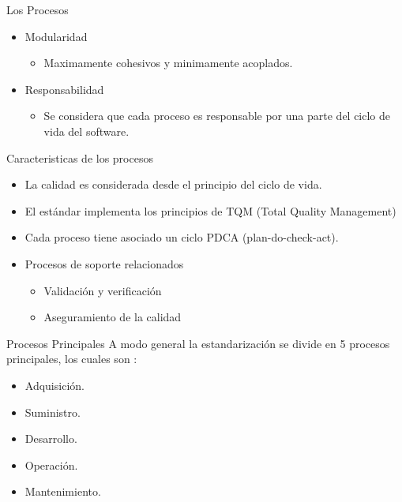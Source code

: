 \documentclass{beamer}
\begin{document}
			\begin{frame}{Los Procesos}
				\begin{itemize}
				 	\item Modularidad\\\pause
				 	\begin{itemize}
				 		\item Maximamente cohesivos y minimamente acoplados.
				 	\end{itemize}	  
				 	\item Responsabilidad\\\pause
				 	\begin{itemize}
				 		\item Se considera que cada proceso es responsable por una parte del ciclo de vida del software.\\
				 	\end{itemize}
				 \end{itemize}
			\end{frame}
			
			\begin{frame}{Caracteristicas de los procesos}
				\begin{itemize}
					\item La calidad es considerada desde el principio del ciclo de vida.\pause
					\item El estándar implementa los principios de TQM (Total Quality Management)\pause
					\item Cada proceso tiene asociado un ciclo PDCA (plan-do-check-act).\pause
					\item Procesos de soporte relacionados\pause
					\begin{itemize}
						\item Validación y verificación 
						\item Aseguramiento de la calidad
					\end{itemize}
				\end{itemize}
			\end{frame}
			
			\begin{frame}{Procesos Principales}
				A modo general la estandarización se divide en 5 procesos principales, los cuales son :\pause  
				\begin{itemize}
					\item Adquisición.
					\item Suministro.
					\item Desarrollo.
					\item Operación.
					\item Mantenimiento.
				\end{itemize}
			\end{frame}
			
\end{document}

